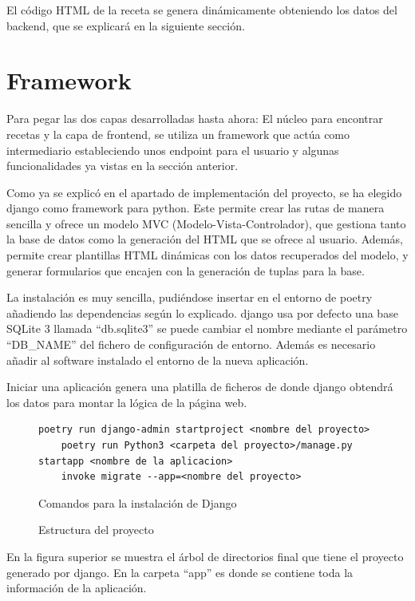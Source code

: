 El código \gls{HTML} de la receta se genera dinámicamente obteniendo los datos del \gls{backend}, que se explicará en la siguiente sección.

\section{Framework}
Para pegar las dos capas desarrolladas hasta ahora: El núcleo para encontrar recetas y la capa de \gls{frontend}, se utiliza un \gls{framework} que actúa como intermediario estableciendo unos \gls{endpoint} para el usuario y algunas funcionalidades ya vistas en la sección anterior. 

Como ya se explicó en el apartado de implementación del proyecto, se ha elegido \Gls{django} como \gls{framework} para \Gls{python}. Este permite crear las rutas de manera sencilla y ofrece un modelo \gls{MVC} (Modelo-Vista-Controlador), que gestiona tanto la base de datos como la generación del \gls{HTML} que se ofrece al usuario. Además, permite crear plantillas \gls{HTML} dinámicas con los datos recuperados del modelo, y generar formularios que encajen con la generación de \glspl{tupla} para la \gls{base}. 

La instalación es muy sencilla, pudiéndose insertar en el entorno de \Gls{poetry} añadiendo las dependencias según lo explicado. \Gls{django} usa por defecto una \gls{base} SQLite 3 llamada ``db.sqlite3'' se puede cambiar el nombre mediante el parámetro ``DB_NAME'' del fichero de configuración de entorno. Además es necesario añadir al software instalado el entorno de la nueva aplicación.

Iniciar una aplicación genera una platilla de ficheros de donde \Gls{django} obtendrá los datos para montar la lógica de la página web. 
\begin{figure}[h!]
\begin{lstlisting}[style=consola]
    poetry run django-admin startproject <nombre del proyecto>
    poetry run Python3 <carpeta del proyecto>/manage.py startapp <nombre de la aplicacion>
    invoke migrate --app=<nombre del proyecto>
\end{lstlisting}
\caption{Comandos para la instalación de Django}
\end{figure}

\newpage
\begin{figure}[h!]
    \caption{Estructura del proyecto}
    \label{fig:django}
\end{figure}
En la figura superior se muestra el árbol de directorios final que tiene el proyecto generado por \Gls{django}. En la carpeta ``app'' es donde se contiene toda la información de la aplicación. 

